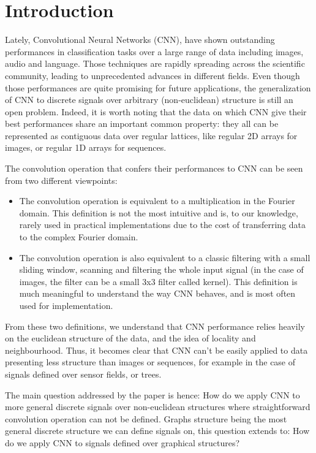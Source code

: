 \section*{Introduction}

Lately, Convolutional Neural Networks (CNN), have shown outstanding performances in classification tasks over a large range of data including images, audio and language. Those techniques are rapidly spreading across the scientific community, leading to unprecedented advances in different fields. Even though those performances are quite promising for future applications, the generalization of CNN to discrete signals over arbitrary (non-euclidean) structure is still an open problem. Indeed, it is worth noting that the data on which CNN give their best performances share an important common property: they all can be represented as contiguous data over regular lattices, like regular 2D arrays for images, or regular 1D arrays for sequences. 

The convolution operation that confers their performances to CNN can be seen from two different viewpoints:
\begin{itemize}
    \item The convolution operation is equivalent to a multiplication in the Fourier domain. This definition is not the most intuitive and is, to our knowledge, rarely used in practical implementations due to the cost of transferring data to the complex Fourier domain. 
    \item The convolution operation is also equivalent to a classic filtering with a small sliding window, scanning and filtering the whole input signal (in the case of images, the filter can be a small 3x3 filter called kernel). This definition is much meaningful to understand the way CNN behaves, and is most often used for implementation.
\end{itemize}

From these two definitions, we understand that CNN performance relies heavily on the euclidean structure of the data, and the idea of locality and neighbourhood. Thus, it becomes clear that CNN can't be easily applied to data presenting less structure than images or sequences, for example in the case of signals defined over sensor fields, or trees.

The main question addressed by the paper is hence: How do we apply CNN to more general discrete signals over non-euclidean structures where straightforward convolution operation can not be defined. Graphs structure being the most general discrete structure we can define signals on, this question extends to: How do we apply CNN to signals defined over graphical structures? 

